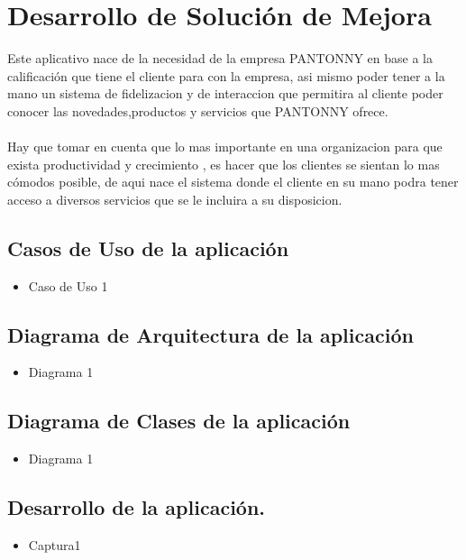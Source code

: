 \documentclass[preprint,12pt]{elsarticle}
\begin{document}
\section{Desarrollo de Solución de Mejora}
Este aplicativo nace de la necesidad de la empresa PANTONNY en base a la calificación que tiene el cliente para con la empresa, asi mismo poder tener a la mano un sistema de fidelizacion y de interaccion que permitira al cliente poder conocer las novedades,productos y servicios que PANTONNY ofrece.
\\  \\
Hay que tomar en cuenta que lo mas importante en una organizacion para que exista productividad  y crecimiento , es hacer que los clientes se sientan lo mas cómodos posible, de aqui nace el sistema donde el cliente en su mano podra tener acceso a diversos servicios que se le incluira a su disposicion.


\subsection{\textbf{Casos de Uso de la aplicación}}
\begin{itemize}
	\item Caso de Uso 1
\end{itemize}

\subsection{\textbf{Diagrama de Arquitectura de la aplicación}}
\begin{itemize}
	\item Diagrama 1
\end{itemize}

\subsection{\textbf{Diagrama de Clases de la aplicación}}
\begin{itemize}
	\item Diagrama 1
\end{itemize}

\subsection{\textbf{Desarrollo de la aplicación.}}
\begin{itemize}
	\item Captura1
\end{itemize}



	
	\newpage
	


	
\end{document}
